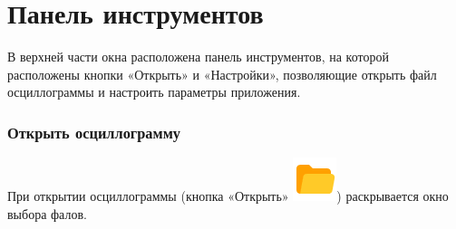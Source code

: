 \documentclass[a4paper,12pt]{article}
\begin{document}
 
\section*{\hspace{.5cm}Панель инструментов } 
\hspace{.5cm}В верхней части окна расположена панель инструментов, на которой расположены кнопки «Открыть» и «Настройки», позволяющие открыть файл осциллограммы и настроить параметры приложения. 
\subsubsection*{\hspace{.5cm} Открыть осциллограмму} 
\hspace{.5cm} При открытии осциллограммы (кнопка «Открыть» \includegraphics[width=4ex]{image/OpenFolder.png}) раскрывается окно выбора фалов. 
\end{document}

